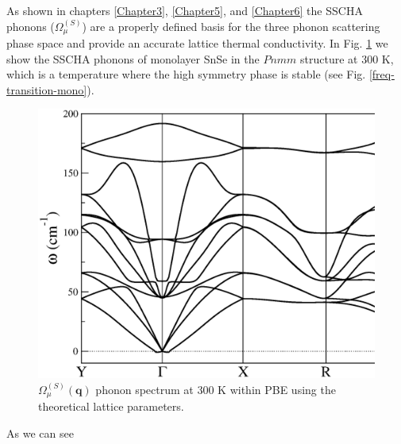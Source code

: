 As shown in chapters \ref{Chapter3}, \ref{Chapter5}, and \ref{Chapter6} the SSCHA phonons ($\Omega^{(S)}_{\mu}$) are 
a properly defined basis for the three phonon scattering phase space and provide an accurate lattice thermal 
conductivity. In Fig. \ref{sscha-freq-mono} we show the SSCHA phonons of monolayer SnSe in the $Pnmm$ structure at 
$300$ K, which is a temperature where the high symmetry phase is stable (see Fig. \ref{freq-transition-mono}).
\begin{figure}[h]
\includegraphics[width=\linewidth]{Figures/sscha-mono.eps}
\caption[Anharmonic phonons in monolayer SnSe.]{$\Omega^{(S)}_{\mu}(\boldsymbol{q})$ phonon spectrum at $300$ K 
within PBE using the theoretical lattice parameters.}
\label{sscha-freq-mono}
\end{figure}
As we can see
